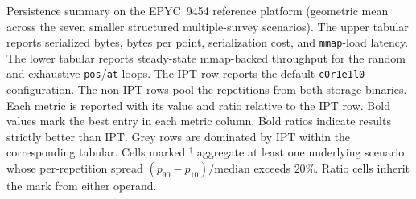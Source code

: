 \documentclass[manuscript,screen,review]{acmart}
\theoremstyle{definition}
\theoremstyle{plain}
\begin{document}
\begin{table}[ht]
\caption{Persistence summary on the EPYC~9454 reference platform
  (geometric mean across the seven smaller structured
  multiple-survey scenarios). The upper tabular reports serialized
  bytes, bytes per point, serialization cost, and \texttt{mmap}-load
  latency. The lower tabular reports steady-state mmap-backed
  throughput for the random and exhaustive \texttt{pos}/\texttt{at}
  loops. The \textsc{IPT} row reports the default \texttt{c0r1e1l0}
  configuration. The non-IPT rows pool the repetitions from both
  storage binaries. Each metric is reported with its value and ratio
  relative to the \textsc{IPT} row. Bold values mark the best entry
  in each metric column. Bold ratios indicate results strictly
  better than \textsc{IPT}. Grey rows are dominated by IPT within
  the corresponding tabular. Cells marked $^{\dagger}$ aggregate at
  least one underlying scenario whose per-repetition spread
  $(p_{90}-p_{10})/\mathrm{median}$ exceeds $20\%$. Ratio cells
  inherit the mark from either operand.}
\label{table:storage-summary}
{\footnotesize}
\end{table}
\end{document}
